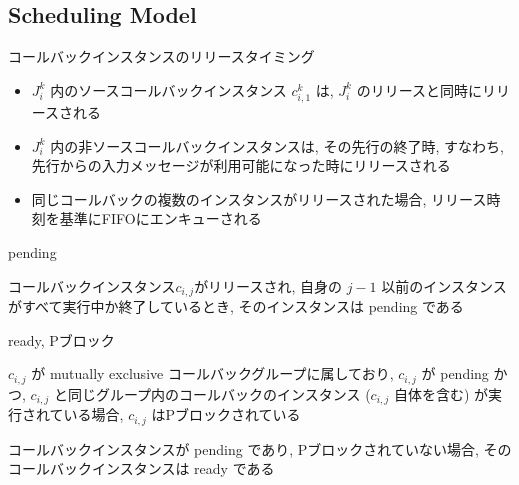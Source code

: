 \subsection{Scheduling Model}
\label{ssec: scheduling_model}


\begin{frame}{コールバックインスタンスのリリースタイミング}
    \begin{itemize}
        \item $J_{i}^{k}$ 内のソースコールバックインスタンス $c_{i, 1}^{k}$ は, $J_{i}^{k}$ のリリースと同時にリリースされる
        \item $J_{i}^{k}$ 内の非ソースコールバックインスタンスは, その先行の終了時, すなわち, 先行からの入力メッセージが利用可能になった時にリリースされる
        \item 同じコールバックの複数のインスタンスがリリースされた場合, リリース時刻を基準にFIFOにエンキューされる
    \end{itemize}
\end{frame}

\begin{frame}{pending}
    \begin{definition}[pending]
        コールバックインスタンス$c_{i, j}$がリリースされ, 自身の $j-1$ 以前のインスタンスがすべて実行中か終了しているとき, そのインスタンスは pending である
    \end{definition}
\end{frame}

\begin{frame}{ready, Pブロック}
    \begin{definition}[Pブロック]
        $c_{i, j}$ が mutually exclusive コールバックグループに属しており, $c_{i, j}$ が pending かつ, $c_{i, j}$ と同じグループ内のコールバックのインスタンス ($c_{i, j}$ 自体を含む) が実行されている場合, $c_{i, j}$ はPブロックされている
    \end{definition}
    \begin{definition}[ready]
        コールバックインスタンスが pending であり, Pブロックされていない場合, そのコールバックインスタンスは ready である
    \end{definition}
\end{frame}

